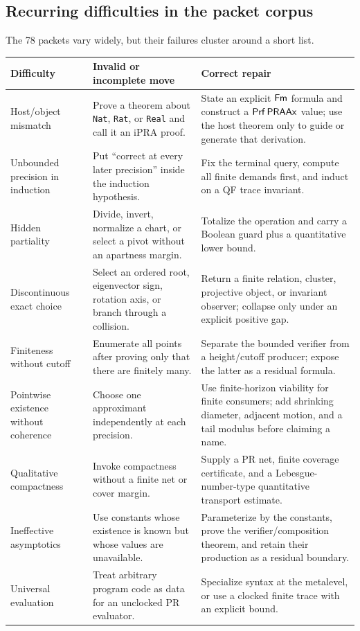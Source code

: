\subsection{Recurring difficulties in the packet corpus}

The 78 packets vary widely, but their failures cluster around a short list.
\begin{longtable}{@{}p{}p{}p{}@{}}
\toprule
Difficulty & Invalid or incomplete move & Correct repair \\
\midrule
\endhead
Host/object mismatch & Prove a theorem about \texttt{Nat}, \texttt{Rat}, or \texttt{Real} and call it an iPRA proof. & State an explicit \(\mathsf{Fm}\) formula and construct a \(\mathsf{Prf}\,\mathsf{PRAAx}\) value; use the host theorem only to guide or generate that derivation. \\
Unbounded precision in induction & Put ``correct at every later precision'' inside the induction hypothesis. & Fix the terminal query, compute all finite demands first, and induct on a QF trace invariant. \\
Hidden partiality & Divide, invert, normalize a chart, or select a pivot without an apartness margin. & Totalize the operation and carry a Boolean guard plus a quantitative lower bound. \\
Discontinuous exact choice & Select an ordered root, eigenvector sign, rotation axis, or branch through a collision. & Return a finite relation, cluster, projective object, or invariant observer; collapse only under an explicit positive gap. \\
Finiteness without cutoff & Enumerate all points after proving only that there are finitely many. & Separate the bounded verifier from a height/cutoff producer; expose the latter as a residual formula. \\
Pointwise existence without coherence & Choose one approximant independently at each precision. & Use finite-horizon viability for finite consumers; add shrinking diameter, adjacent motion, and a tail modulus before claiming a name. \\
Qualitative compactness & Invoke compactness without a finite net or cover margin. & Supply a PR net, finite coverage certificate, and a Lebesgue-number-type quantitative transport estimate. \\
Ineffective asymptotics & Use constants whose existence is known but whose values are unavailable. & Parameterize by the constants, prove the verifier/composition theorem, and retain their production as a residual boundary. \\
Universal evaluation & Treat arbitrary program code as data for an unclocked PR evaluator. & Specialize syntax at the metalevel, or use a clocked finite trace with an explicit bound. \\
\bottomrule
\end{longtable}

